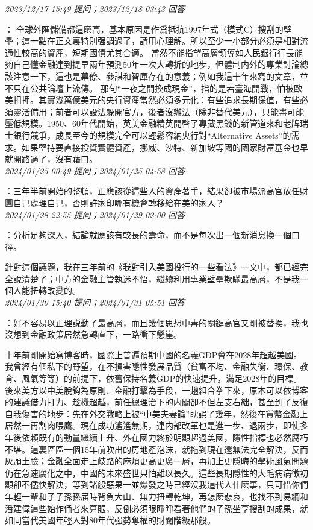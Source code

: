 \documentclass[twocolumn]{ctexart}
\begin{document}
\textit{\hfill\noindent\small 2023/12/17 15:49 提问；2023/12/18 03:43 回答}

：
全球外匯儲備都這麽高，基本原因是作爲抵抗1997年式（模式C）搜刮的壁壘；這一點在正文裏特別强調過了，請用心理解。所以至少一小部分必須是相對流通性較高的資產，短期國債尤其合適。
當然不能指望高層領導如人民銀行行長能夠自己懂金融達到提早兩年預測50年一次大轉折的地步，但體制内外的專業討論總該注意一下，這也是幕僚、參謀和智庫存在的意義；例如我這十年來寫的文章，並不只在公共論壇上流傳。
那句“一夜之間換成現金”，指的是若臺海開戰，怕被歐美扣押。其實幾萬億美元的央行資產當然必須多元化：有些追求長期保值，有些必須靈活備用；前者可以設法躲開官方，後者沒辦法（除非替代美元），只能盡可能壓低規模。1950、60年代開始，英美金融精英開啓了專藏黑錢的新管道來和老牌瑞士銀行競爭，成長至今的規模完全可以輕鬆容納央行對“Alternative Assets”的需求。如果堅持要直接投資實體資產，挪威、沙特、新加坡等國的國家財富基金也早就開路過了，沒有藉口。
\\

\textit{\hfill\noindent\small 2024/01/25 00:49 提问；2024/01/25 04:58 回答}

：三年半前開始的整頓，正應該從這些人的資產著手，結果卻被市場派高官放任財團自己處理自己，否則許家印哪有機會轉移給在美的家人？
\\

\textit{\hfill\noindent\small 2024/01/28 22:55 提问；2024/01/29 02:00 回答}

：分析足夠深入，結論就應該有較長的壽命，而不是每次出一個新消息換一個口徑。

針對這個議題，我在三年前的《我對引入美國投行的一些看法》一文中，都已經完全說清楚了；中方的金融主管執迷不悟，繼續利用專業壁壘欺瞞最高層，不是我一個人能扭轉改變的。
\\

\textit{\hfill\noindent\small 2024/01/30 15:40 提问；2024/01/31 05:51 回答}

：好不容易以正理説動了最高層，而且幾個思想中毒的關鍵高官又剛被替換，我也沒想到金融政策居然急轉直下，一路衝下懸崖。

十年前剛開始寫博客時，國際上普遍預期中國的名義GDP會在2028年超越美國。我曾經有個私下的野望，在不損害隱性發展品質（貧富不均、金融失衡、環保、教育、風氣等等）的前提下，依舊保持名義GDP的快速提升，滿足2028年的目標。後來美方以中美脫鈎為原則、金融打擊為手段，一趟組合拳下來，原本可以依博客的建議借力打力、趁機超越，前任總理治下的内閣卻不但左支右絀，甚至到了反復自我傷害的地步：先在外交戰略上被“中美夫妻論”耽誤了幾年，然後在貨幣金融上居然一再割肉喂鷹。現在成功遙遙無期，連内部改革也是進一步、退兩步，即使多年後依賴既有的動量繼續上升、外在國力終於明顯超過美國，隱性指標也必然腐朽不堪。這裏區區一個15年前吹出的房地產泡沫，就拖到現在還無法完全解決，反而灰頭土臉；金融全面走上歧路的麻煩更高更廣一層，再加上更隱晦的學術風氣問題仍在急速腐化之中，中國的未來盛世只怕難以長久。這些長期隱性的大毛病病徵初顯卻不儘快解決，等到諸般惡果一並爆發之時已經沒我這代人什麽事，只可惜你們年輕一輩和子子孫孫届時背負大山、無力扭轉乾坤，再怎麽悲哀，也找不到易綱和潘建偉這些始作俑者來算賬，反倒必須眼睜睜看著他們的子孫坐享搜刮的成果，就如同當代美國年輕人對80年代强勢奪權的財閥階級那般。
\\
\end{document}
